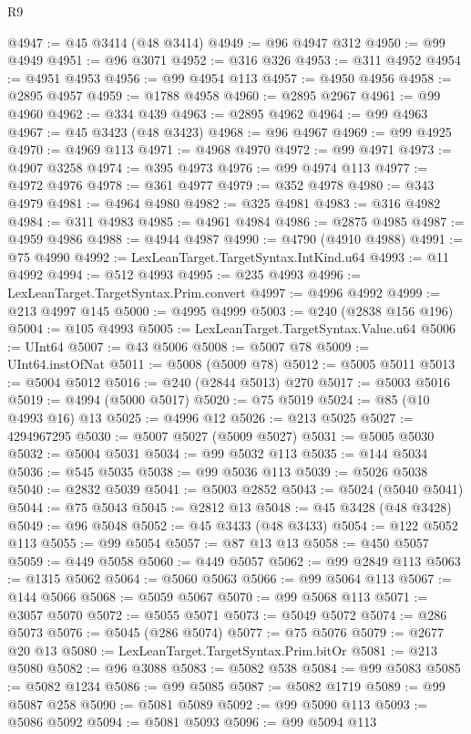 \begin{lexlean}{R9}
\begin{coremodule}
@4947 := @45 @3414 (@48 @3414)
@4949 := @96 @4947 @312
@4950 := @99 @4949
@4951 := @96 @3071
@4952 := @316 @326
@4953 := @311 @4952
@4954 := @4951 @4953
@4956 := @99 @4954 @113
@4957 := @4950 @4956
@4958 := @2895 @4957
@4959 := @1788 @4958
@4960 := @2895 @2967
@4961 := @99 @4960
@4962 := @334 @439
@4963 := @2895 @4962
@4964 := @99 @4963
@4967 := @45 @3423 (@48 @3423)
@4968 := @96 @4967
@4969 := @99 @4925
@4970 := @4969 @113
@4971 := @4968 @4970
@4972 := @99 @4971
@4973 := @4907 @3258
@4974 := @395 @4973
@4976 := @99 @4974 @113
@4977 := @4972 @4976
@4978 := @361 @4977
@4979 := @352 @4978
@4980 := @343 @4979
@4981 := @4964 @4980
@4982 := @325 @4981
@4983 := @316 @4982
@4984 := @311 @4983
@4985 := @4961 @4984
@4986 := @2875 @4985
@4987 := @4959 @4986
@4988 := @4944 @4987
@4990 := @4790 (@4910 @4988)
@4991 := @75 @4990
@4992 := LexLeanTarget.TargetSyntax.IntKind.u64
@4993 := @11 @4992
@4994 := @512 @4993
@4995 := @235 @4993
@4996 := LexLeanTarget.TargetSyntax.Prim.convert
@4997 := @4996 @4992
@4999 := @213 @4997 @145
@5000 := @4995 @4999
@5003 := @240 (@2838 @156 @196)
@5004 := @105 @4993
@5005 := LexLeanTarget.TargetSyntax.Value.u64
@5006 := UInt64
@5007 := @43 @5006
@5008 := @5007 @78
@5009 := UInt64.instOfNat
@5011 := @5008 (@5009 @78)
@5012 := @5005 @5011
@5013 := @5004 @5012
@5016 := @240 (@2844 @5013) @270
@5017 := @5003 @5016
@5019 := @4994 (@5000 @5017)
@5020 := @75 @5019
@5024 := @85 (@10 @4993 @16) @13
@5025 := @4996 @12
@5026 := @213 @5025
@5027 := 4294967295
@5030 := @5007 @5027 (@5009 @5027)
@5031 := @5005 @5030
@5032 := @5004 @5031
@5034 := @99 @5032 @113
@5035 := @144 @5034
@5036 := @545 @5035
@5038 := @99 @5036 @113
@5039 := @5026 @5038
@5040 := @2832 @5039
@5041 := @5003 @2852
@5043 := @5024 (@5040 @5041)
@5044 := @75 @5043
@5045 := @2812 @13
@5048 := @45 @3428 (@48 @3428)
@5049 := @96 @5048
@5052 := @45 @3433 (@48 @3433)
@5054 := @122 @5052 @113
@5055 := @99 @5054
@5057 := @87 @13 @13
@5058 := @450 @5057
@5059 := @449 @5058
@5060 := @449 @5057
@5062 := @99 @2849 @113
@5063 := @1315 @5062
@5064 := @5060 @5063
@5066 := @99 @5064 @113
@5067 := @144 @5066
@5068 := @5059 @5067
@5070 := @99 @5068 @113
@5071 := @3057 @5070
@5072 := @5055 @5071
@5073 := @5049 @5072
@5074 := @286 @5073
@5076 := @5045 (@286 @5074)
@5077 := @75 @5076
@5079 := @2677 @20 @13
@5080 := LexLeanTarget.TargetSyntax.Prim.bitOr
@5081 := @213 @5080
@5082 := @96 @3088
@5083 := @5082 @538
@5084 := @99 @5083
@5085 := @5082 @1234
@5086 := @99 @5085
@5087 := @5082 @1719
@5089 := @99 @5087 @258
@5090 := @5081 @5089
@5092 := @99 @5090 @113
@5093 := @5086 @5092
@5094 := @5081 @5093
@5096 := @99 @5094 @113

\end{coremodule}
\end{lexlean}
